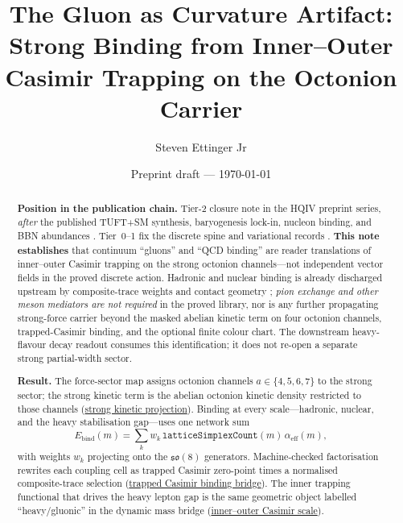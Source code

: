 \documentclass[11pt]{amsart}
\title[The Gluon as Curvature Artifact]{The Gluon as Curvature Artifact:\\
Strong Binding from Inner--Outer Casimir Trapping on the Octonion Carrier}
\author{Steven Ettinger Jr}
\date{Preprint draft --- \today}
\begin{document}
\begin{abstract}
\noindent\textbf{Position in the publication chain.}
Tier-2 closure note in the HQIV preprint series, \emph{after} the published
TUFT+SM synthesis, baryogenesis lock-in, nucleon binding, and BBN abundances
\cite{hqiv-tuft-sm-lagrangian-paper,hqiv-baryogenesis-paper,hqiv-nucleon-binding-paper,hqiv-bbn-paper}.
Tier~0--1 fix the discrete spine and variational records
\cite{ettinger2026hqiv,hqiv-lightcone-paper,hqiv-so8-paper,hqiv-3d-growth-paper,hqiv-oct-action-paper,hqiv-kirchhoff-paper,hqiv-thermo-arrow-paper}.
\textbf{This note establishes} that continuum ``gluons'' and ``QCD binding'' are
reader translations of inner--outer Casimir trapping on the strong octonion
channels---not independent vector fields in the proved discrete action.
Hadronic and nuclear binding is already discharged upstream by composite-trace
weights and contact geometry \cite{hqiv-nucleon-binding-paper}; \emph{pion exchange
and other meson mediators are not required} in the proved library, nor is any
further propagating strong-force carrier beyond the masked abelian kinetic term on
four octonion channels, trapped-Casimir binding, and the optional finite colour
chart. The downstream heavy-flavour decay readout \cite{hqiv-hep-decay-paper} consumes this
identification; it does not re-open a separate strong partial-width sector.

\noindent\textbf{Result.}
The force-sector map assigns octonion channels $a\in\{4,5,6,7\}$ to the strong
sector; the strong kinetic term is the abelian octonion kinetic density restricted
to those channels (\hyperref[lean:strong-kinetic]{strong kinetic projection}).
Binding at every scale---hadronic, nuclear, and the heavy stabilisation
gap---uses one network sum
\[
E_{\mathrm{bind}}(m)=\sum_k w_k\,\texttt{latticeSimplexCount}(m)\,\alpha_{\mathrm{eff}}(m),
\]
with weights $w_k$ projecting onto the $\mathfrak{so}(8)$ generators.
Machine-checked factorisation rewrites each coupling cell as trapped Casimir
zero-point times a normalised composite-trace selection
(\hyperref[lean:trapped-casimir-bridge]{trapped Casimir binding bridge}).
The inner trapping functional that drives the heavy lepton gap is the same
geometric object labelled ``heavy/gluonic'' in the dynamic mass bridge
(\hyperref[lean:inner-outer-casimir]{inner--outer Casimir scale}).


\end{abstract}
\end{document}
